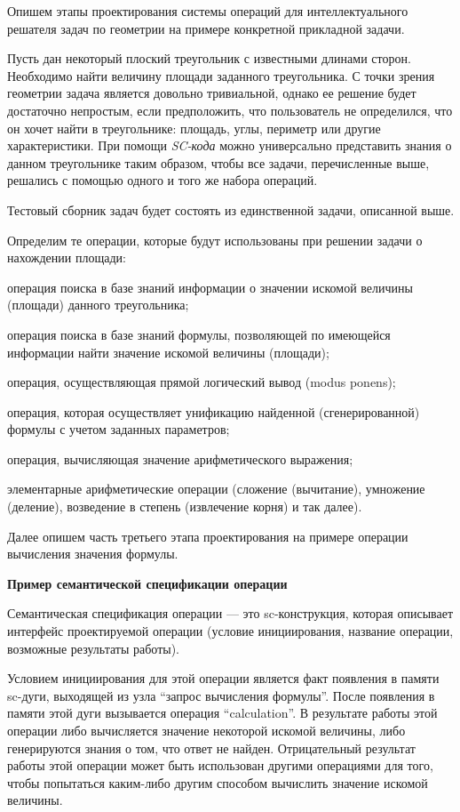Опишем этапы проектирования системы операций для интеллектуального решателя задач по геометрии на примере конкретной прикладной задачи.

Пусть дан некоторый плоский треугольник с известными длинами сторон. Необходимо найти величину площади заданного треугольника. С точки зрения геометрии задача является довольно тривиальной, однако ее решение будет достаточно непростым, если предположить, что пользователь не определился, что он хочет найти в треугольнике: площадь, углы, периметр или другие характеристики. При помощи \textit{SC-кода} можно универсально представить знания о данном треугольнике таким образом, чтобы все задачи, перечисленные выше, решались с помощью одного и того же набора операций.

Тестовый сборник задач будет состоять из единственной задачи, описанной выше.

Определим те операции, которые будут использованы при решении задачи о нахождении площади:

\begin{textitemize}
	\item операция поиска в базе знаний информации о значении искомой величины (площади) данного треугольника;
	\item операция поиска в базе знаний формулы, позволяющей по имеющейся информации найти значение искомой величины (площади);
	\item операция, осуществляющая прямой логический вывод (modus ponens);
	\item операция, которая осуществляет унификацию найденной (сгенерированной) формулы с учетом заданных параметров;
	\item операция, вычисляющая значение арифметического выражения;
	\item элементарные арифметические операции (сложение (вычитание), умножение (деление), возведение в степень (извлечение корня) и так далее).
\end{textitemize}

Далее опишем часть третьего этапа проектирования на примере операции вычисления значения формулы.

\textbf{Пример семантической спецификации операции}

Семантическая спецификация операции --- это sc-конструкция, которая описывает интерфейс проектируемой операции (условие инициирования, название операции, возможные результаты работы).

Условием инициирования для этой операции является факт появле­ния в памяти sc-дуги, выходящей из узла ``запрос вычисления формулы''. После появления в памяти этой дуги вызывается операция ``calculation''. В результате работы этой операции либо вычисляется значение некоторой искомой величины, либо генерируются знания о том, что ответ не найден. Отрицательный результат работы этой операции может быть использован другими операциями для того, чтобы попытаться каким-либо другим способом вычислить значение искомой величины.

